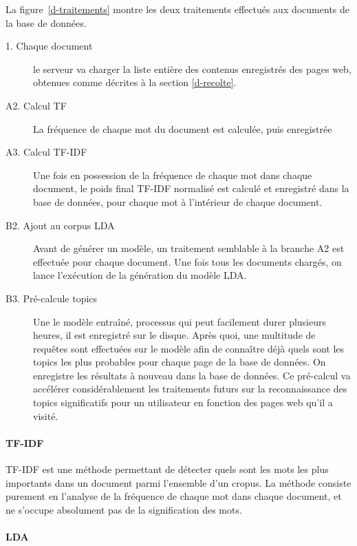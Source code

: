			La figure~\ref{d-traitements} montre les deux traitements effectués aux documents de la base de données.

			\begin{description}
				\item[1. Chaque document] le serveur va charger la liste entière des contenus enregistrés des pages web, obtenues comme décrites à la section \ref{d-recolte}.
				\item[A2. Calcul TF] La fréquence de chaque mot du document est calculée, puis enregistrée
				\item[A3. Calcul TF-IDF] Une fois en possession de la fréquence de chaque mot dans chaque document, le poids final TF-IDF normalisé est calculé et enregistré dans la base de données, pour chaque mot à l'intérieur de chaque document.
				\item[B2. Ajout au corpus LDA] Avant de générer un modèle, un traitement semblable à la branche A2 est effectuée pour chaque document. Une fois tous les documents chargés, on lance l'exécution de la génération du modèle LDA.
				\item[B3. Pré-calcule topics] Une le modèle entraîné, processus qui peut facilement durer plusieurs heures, il est enregistré sur le disque. Après quoi, une multitude de requêtes sont effectuées sur le modèle afin de connaître déjà quels sont les topics les plus probables pour chaque page de la base de données. On enregistre les résultats à nouveau dans la base de données. Ce pré-calcul va accélérer considérablement les traitements futurs sur la reconnaissance des topics significatifs pour un utilisateur en fonction des pages web qu'il a visité. 

			\end{description}

			\paragraph{TF-IDF}

				TF-IDF est une méthode permettant de détecter quels sont les mots les plus importants dans un document parmi l'ensemble d'un cropus. La méthode consiste purement en l'analyse de la fréquence de chaque mot dans chaque document, et ne s'occupe absolument pas de la signification des mots.

			\paragraph{LDA}


